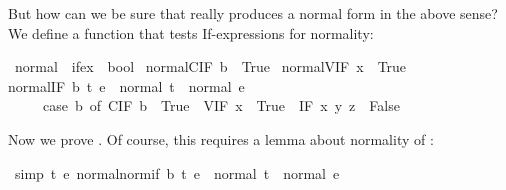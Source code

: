 \begin{isabellebody}
\begin{isamarkuptext}
But how can we be sure that  really produces a normal form in
the above sense? We define a function that tests If-expressions for normality:%
\end{isamarkuptext}%
\isamarkuptrue%
\isamarkupfalse%
\ normal\ {}{}\ {}ifex\ {}\ bool{}\ \isanewline
{}normal{}CIF\ b{}\ {}\ True{}\ {}\isanewline
{}normal{}VIF\ x{}\ {}\ True{}\ {}\isanewline
{}normal{}IF\ b\ t\ e{}\ {}\ {}normal\ t\ {}\ normal\ e\ {}\isanewline
\ \ \ \ \ {}case\ b\ of\ CIF\ b\ {}\ True\ {}\ VIF\ x\ {}\ True\ {}\ IF\ x\ y\ z\ {}\ False{}{}{}%
\begin{isamarkuptext}%
\noindent
Now we prove . Of course, this requires a lemma about
normality of :%
\end{isamarkuptext}%
\isamarkuptrue%
\isamarkupfalse%
\ {}simp{}{}\ {}{}t\ e{}\ normal{}normif\ b\ t\ e{}\ {}\ {}normal\ t\ {}\ normal\ e{}{}%

\end{isabellebody}
